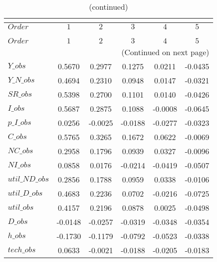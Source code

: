  
\begin{center}
\begin{longtable}{lccccc} 
\caption{COEFFICIENTS OF AUTOCORRELATION}\\
 \label{Table:th_autocorr_matrix}\\
\toprule 
$Order          $	 & 	 $          1$	 & 	 $          2$	 & 	 $          3$	 & 	 $          4$	 & 	 $          5$\\
\midrule \endfirsthead 
\caption{(continued)}\\
 \toprule \\ 
$Order          $	 & 	 $          1$	 & 	 $          2$	 & 	 $          3$	 & 	 $          4$	 & 	 $          5$\\
\midrule \endhead 
\midrule \multicolumn{6}{r}{(Continued on next page)} \\ \bottomrule \endfoot 
\bottomrule \endlastfoot 
$Y\_obs         $	 & 	     0.5670	 & 	     0.2977	 & 	     0.1275	 & 	     0.0211	 & 	    -0.0435 \\ 
$Y\_N\_obs      $	 & 	     0.4694	 & 	     0.2310	 & 	     0.0948	 & 	     0.0147	 & 	    -0.0321 \\ 
$SR\_obs        $	 & 	     0.5398	 & 	     0.2700	 & 	     0.1101	 & 	     0.0140	 & 	    -0.0426 \\ 
$I\_obs         $	 & 	     0.5687	 & 	     0.2875	 & 	     0.1088	 & 	    -0.0008	 & 	    -0.0645 \\ 
$p\_I\_obs      $	 & 	     0.0256	 & 	    -0.0025	 & 	    -0.0188	 & 	    -0.0277	 & 	    -0.0323 \\ 
$C\_obs         $	 & 	     0.5765	 & 	     0.3265	 & 	     0.1672	 & 	     0.0622	 & 	    -0.0069 \\ 
$NC\_obs        $	 & 	     0.2958	 & 	     0.1796	 & 	     0.0939	 & 	     0.0327	 & 	    -0.0096 \\ 
$NI\_obs        $	 & 	     0.0858	 & 	     0.0176	 & 	    -0.0214	 & 	    -0.0419	 & 	    -0.0507 \\ 
$util\_ND\_obs  $	 & 	     0.2856	 & 	     0.1788	 & 	     0.0959	 & 	     0.0338	 & 	    -0.0106 \\ 
$util\_D\_obs   $	 & 	     0.4683	 & 	     0.2236	 & 	     0.0702	 & 	    -0.0216	 & 	    -0.0725 \\ 
$util\_obs      $	 & 	     0.4157	 & 	     0.2196	 & 	     0.0878	 & 	     0.0025	 & 	    -0.0498 \\ 
$D\_obs         $	 & 	    -0.0148	 & 	    -0.0257	 & 	    -0.0319	 & 	    -0.0348	 & 	    -0.0354 \\ 
$h\_obs         $	 & 	    -0.1730	 & 	    -0.1179	 & 	    -0.0792	 & 	    -0.0523	 & 	    -0.0338 \\ 
$tech\_obs      $	 & 	     0.0633	 & 	    -0.0021	 & 	    -0.0188	 & 	    -0.0205	 & 	    -0.0183 \\ 
\end{longtable}
 \end{center}
